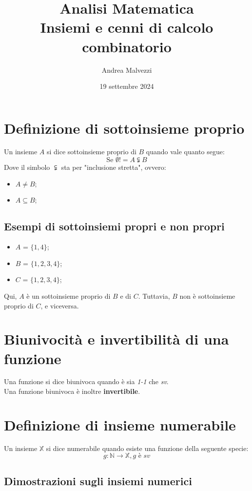 \documentclass[12pt]{article}
\title{\textbf{Analisi Matematica\\Insiemi e cenni di calcolo combinatorio}}
\date{19 settembre 2024}
\author{Andrea Malvezzi}
\begin{document}
\maketitle
\pagebreak
\tableofcontents
\pagebreak
\section{Definizione di sottoinsieme proprio}
Un insieme $A$ si dice sottoinsieme proprio di $B$ quando vale quanto segue:
\begin{equation}
    \text{Se } \emptyset != A \subsetneqq \label{eq:sottoinsieme_proprio}B
\end{equation}
Dove il simbolo $\subsetneqq$ sta per "inclusione stretta", ovvero:
\begin{itemize}
    \item $A \not= B$;
    \item $A \subseteq B$;
\end{itemize}
\subsection{Esempi di sottoinsiemi propri e non propri}
\begin{itemize}
    \item $A$ = $\{1, 4\}$;
    \item $B$ = $\{1, 2, 3, 4\}$;
    \item $C$ = $\{1, 2, 3, 4\}$;
\end{itemize}
Qui, $A$ è un sottoinsieme proprio di $B$ e di $C$. Tuttavia, $B$ non è sottoinsieme proprio di $C$, e viceversa.
\section{Biunivocità e invertibilità di una funzione}
Una funzione si dice biunivoca quando è sia \textit{1-1} che \textit{sv}.\\
Una funzione biunivoca è inoltre \textbf{invertibile}.
\section{Definizione di insieme numerabile}
Un insieme $\mathbb{X}$ si dice numerabile quando esiste una funzione della seguente specie:
\begin{equation}
    g: \mathbb{N} \rightarrow \mathbb{X}, \textit{g è sv} \label{eq:insieme_numerabile}
\end{equation}
\subsection{Dimostrazioni sugli insiemi numerici}
\end{document}
